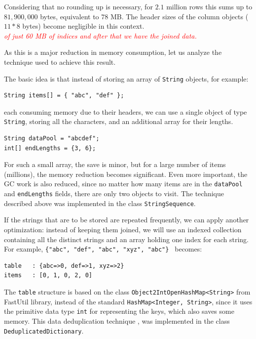 \documentclass[a4paper,twoside]{article}
\begin{document}
Considering that no rounding up is necessary, for $2.1$ million rows this sums up to $81,900,000$ bytes,
equivalent to $78$ MB. The header sizes of the column objects ($11*8$ bytes) become negligible in this context.
\\ \textcolor{red}{{\it of just 60 MB of indices and after that we have the joined data.}}

As this is a major reduction in memory consumption, let us analyze the technique used to achieve this result.

The basic idea is that instead of storing an array of {\tt String} objects, for example:
\begin{verbatim}
String items[] = { "abc", "def" };
\end{verbatim}
each consuming memory due to their headers, we can use 
a single object of type {\tt String}, storing all the characters, and an additional array for their lengths.
\begin{verbatim}
String dataPool = "abcdef";
int[] endLengths = {3, 6};
\end{verbatim}

For such a small array, the save is minor, but for a large number of items (millions), the memory reduction becomes significant. Even more important, the GC work is also reduced, since no matter how many items are in the {\tt dataPool} and {\tt endLengths} fields, there are only two objects to visit.
The technique described above was implemented in the class {\tt StringSequence}.

If the strings that are to be stored are repeated frequently, we can apply another optimization:
instead of keeping them joined, we will use an indexed collection containing all the distinct strings and an array holding one index for each string.
For example, {\tt \{"abc", "def", "abc", "xyz", "abc"\} } becomes: 
\begin{verbatim}
table   : {abc=>0, def=>1, xyz=>2}
items   : [0, 1, 0, 2, 0]
\end{verbatim}
The {\tt table} structure is based on the class {\tt Object2IntOpenHashMap<String>} from FastUtil library, instead of the standard {\tt HashMap<Integer, String>}, since it uses the primitive data type {\tt int} for representing the keys, which also saves some memory.
This data deduplication technique \cite{he:2010}, \cite{manogar:2014} was implemented in the class {\tt DeduplicatedDictionary}.
\end{document}
